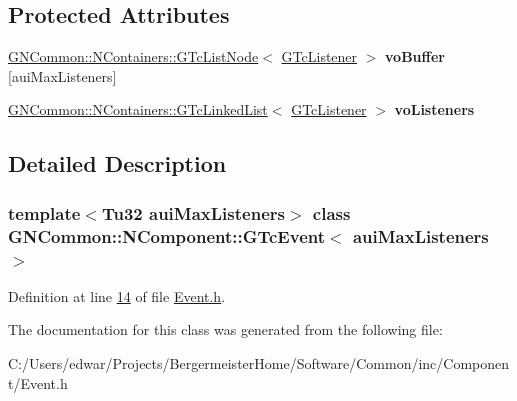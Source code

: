 \subsection*{Protected Attributes}
\begin{DoxyCompactItemize}
\item 
\mbox{\label{class_g_n_common_1_1_n_component_1_1_g_tc_event_ae060ae772a0689936a5ce21802e1766b}} 
\mbox{\hyperlink{class_g_n_common_1_1_n_containers_1_1_g_tc_list_node}{G\+N\+Common\+::\+N\+Containers\+::\+G\+Tc\+List\+Node}}$<$ \mbox{\hyperlink{class_g_n_common_1_1_n_component_1_1_g_tc_listener}{G\+Tc\+Listener}} $>$ {\bfseries vo\+Buffer} \mbox{[}aui\+Max\+Listeners\mbox{]}
\item 
\mbox{\label{class_g_n_common_1_1_n_component_1_1_g_tc_event_a4bdfc0245a63301bb4d6df850f066ef1}} 
\mbox{\hyperlink{class_g_n_common_1_1_n_containers_1_1_g_tc_linked_list}{G\+N\+Common\+::\+N\+Containers\+::\+G\+Tc\+Linked\+List}}$<$ \mbox{\hyperlink{class_g_n_common_1_1_n_component_1_1_g_tc_listener}{G\+Tc\+Listener}} $>$ {\bfseries vo\+Listeners}
\end{DoxyCompactItemize}


\subsection{Detailed Description}
\subsubsection*{template$<$Tu32 aui\+Max\+Listeners$>$\newline
class G\+N\+Common\+::\+N\+Component\+::\+G\+Tc\+Event$<$ aui\+Max\+Listeners $>$}



Definition at line \mbox{\hyperlink{_event_8h_source_l00014}{14}} of file \mbox{\hyperlink{_event_8h_source}{Event.\+h}}.



The documentation for this class was generated from the following file\+:\begin{DoxyCompactItemize}
\item 
C\+:/\+Users/edwar/\+Projects/\+Bergermeister\+Home/\+Software/\+Common/inc/\+Component/Event.\+h\end{DoxyCompactItemize}
